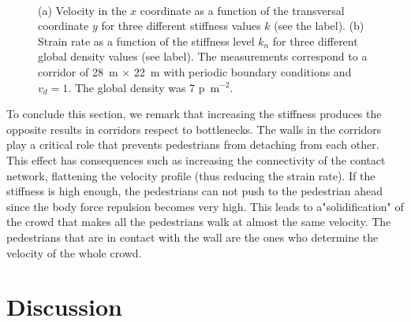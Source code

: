 \documentclass[preprint,12pt]{elsarticle}
\begin{document}
\begin{figure}[!htbp]
\centering
    \ 
    \\
\caption[width=0.47\columnwidth]{(a) Velocity in the $x$ coordinate as a function of the transversal coordinate $y$ for three different stiffness values $k$ (see the label). (b) Strain rate as a function of the stiffness level $k_n$ for three different global density values (see label). The measurements correspond to a corridor of 28~m $\times$ 22~m with periodic boundary conditions and $v_d=1$. The global density was 7 p~m$^{-2}$.  }
\label{profile_strain}
\end{figure}


To conclude this section, we remark that increasing the stiffness produces the opposite results in corridors respect to bottlenecks. The walls in the corridors play a critical role that prevents pedestrians from detaching from each other. This effect has consequences such as increasing the connectivity of the contact network, flattening the velocity profile (thus reducing the strain rate). If the stiffness is high enough, the pedestrians can not push to the pedestrian ahead since the body force repulsion becomes very high. This leads to a"solidification" of the crowd that makes all the pedestrians walk at almost the same velocity. The pedestrians that are in contact with the wall are the ones who determine the velocity of the whole crowd. \\

\section{\label{discussion}Discussion}
\end{document}
